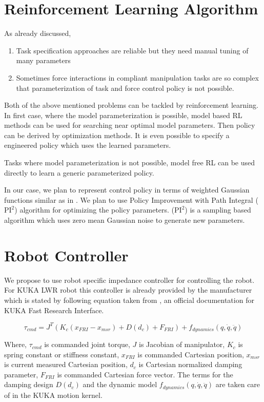 \documentclass[thesis]{mas_proposal}
\begin{document}
\section{Reinforcement Learning Algorithm}

As already discussed, \begin{enumerate}
	\item Task specification approaches are reliable but they need manual tuning of many parameters
	\item Sometimes force interactions in compliant manipulation tasks are so complex that parameterization of task and force control policy is not possible. 
\end{enumerate}
Both of the above mentioned problems can be tackled by reinforcement learning. In first case, where the model parameterization is possible, model based RL methods can be used for searching near optimal model parameters. Then policy can be derived by optimization methods. It is even possible to specify a engineered policy which uses the learned parameters.

Tasks where model parameterization is not possible, model free RL can be used directly to learn a generic parameterized policy. 

In our case, we plan to represent control policy in terms of weighted Gaussian functions similar as in \cite{nemec2017door}. We plan to use Policy Improvement with Path Integral ($\text{PI}^{2}$) algorithm\cite{theodorou2010learning} for optimizing the policy parameters. ($\text{PI}^{2}$) is a sampling based algorithm which uses zero mean Gaussian noise to generate new parameters.    

\section{Robot Controller}

We propose to use robot specific impedance controller for controlling the robot. For KUKA LWR robot this controller is already provided by the manufacturer which is stated by following equation taken from \cite{schreiber2010fast}, an official documentation for KUKA Fast Research Interface.

\begin{equation}
\tau_{cmd} = J^{T}(K_{c}(x_{FRI} - x_{msr}) + D(d_{c}) + F_{FRI}) + f_{dynamics}(q, \dot{q}, \ddot{q})
\end{equation}

Where,
$\tau_{cmd}$ is commanded joint torque, $J$ is Jacobian of manipulator, $K_{c}$ is spring constant or stiffness constant, $x_{FRI}$ is commanded Cartesian position, $x_{msr}$ is current measured Cartesian position, $d_{c}$ is Cartesian normalized damping parameter, $F_{FRI}$ is commanded Cartesian force vector. The terms for the damping design $D(d_{c})$ and the dynamic model $f_{dynamics}(q, \dot{q}, \ddot{q})$ are taken care of in the KUKA motion
kernel.   
\end{document}

